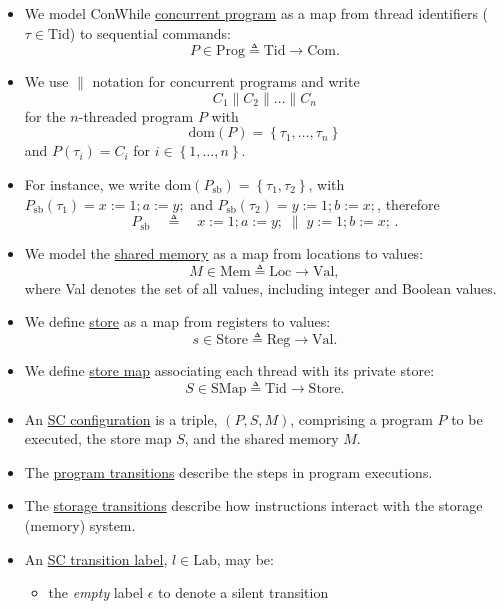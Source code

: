 \documentclass[twocolumn,landscape,10pt]{article}
\theoremstyle{definition}
\begin{document}
\begin{itemize}
    \item We model ConWhile \underline{concurrent program} as a map 
        from thread identifiers ($\tau\in\text{Tid}$) to sequential commands:
        \[
            P\in\text{Prog}\triangleq\text{Tid}\rightarrow\text{Com}.
        \]
    \item We use $\parallel$ notation for concurrent programs and write 
        \[
            C_1\parallel C_2\parallel \ldots\parallel C_n
        \]
        for the $n$-threaded program $P$ with
        \[
            \text{dom}(P)=\left\{\tau_1,\ldots,\tau_n\right\}
        \]
        and
        $P(\tau_i)=C_i$ for $i\in\left\{1,\ldots,n\right\}$.
    \item For instance, we write
        $\text{dom}(P_{\text{sb}})=\left\{\tau_1,\tau_2\right\}$,
        with $P_{\text{sb}}(\tau_1)=x:=1;a:=y;$ and
        $P_{\text{sb}}(\tau_2)=y:=1;b:=x;$, therefore
        \[
            P_{\text{sb}}\quad\triangleq\quad
            x:=1;a:=y;\;\parallel\;y:=1;b:=x;\,.
        \]
    \item We model the \underline{shared memory} as a map from locations to
        values:
        \[
            M\in\text{Mem}\triangleq\text{Loc}\rightarrow\text{Val},
        \]
        where Val denotes the set of all values, including integer and Boolean
        values.
    \item We define \underline{store} as a map from registers to values:
        \[
            s\in\text{Store}\triangleq\text{Reg}\rightarrow\text{Val}.
        \]
    \item We define \underline{store map} associating each thread with its
        private store:
        \[
            S\in\text{SMap}\triangleq\text{Tid}\rightarrow\text{Store}.
        \]
    \item An \underline{SC configuration} is a triple, $(P,S,M)$, comprising a
        program $P$ to be executed, the store map $S$, and the shared memory
        $M$.
    \item The \underline{program transitions} describe the steps in program
        executions.
    \item The \underline{storage transitions} describe how instructions interact
        with the storage (memory) system.
    \item An \underline{SC transition label}, $l\in\text{Lab}$, may be:
        \begin{itemize}
            \item the \emph{empty} label $\epsilon$ to denote a silent transition

\end{itemize}
\end{itemize}
\end{document}
